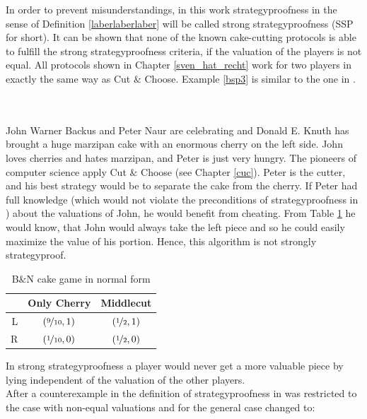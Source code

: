In order to prevent misunderstandings, in this work strategyproofness in the sense of Definition \ref{laberlaberlaber} will be called strong strategyproofness (SSP for short). It can be shown that none of the known cake-cutting protocols is able to fulfill the strong strategyproofness criteria, if the valuation of the players is not equal. All protocols shown in Chapter \ref{sven_hat_recht} work for two players in exactly the same way as Cut $\&$ Choose. Example \ref{bsp3} is similar to the one in \cite{chen:truth}.

\begin{bsp}
\label{bsp3}
\textcolor{white}{x}\\\\
John Warner Backus and Peter Naur are celebrating and Donald E. Knuth has brought a huge marzipan cake with an enormous cherry on the left side. John loves cherries and hates marzipan, and Peter is just very hungry. The pioneers of computer science apply Cut $\&$ Choose (see Chapter \ref{cuc}). Peter is the cutter, and his best strategy would be to separate the cake from the cherry. If Peter had full knowledge (which would not violate the preconditions of strategyproofness in \cite{why}) about the valuations of John, he would benefit from cheating. From Table \ref{Table4} he would know, that John would always take the left piece and so he could easily maximize the value of his portion. Hence, this algorithm is not strongly strategyproof.  
\end{bsp}
\begin{table}[htb]
\centering
 \renewcommand{\arraystretch}{1.2} 
\begin{tabular}{c|c|c|}
\cline{2-3}
&\multicolumn{1}{|c|}{{Only Cherry}}& {Middlecut}\\
\hline
\multicolumn{1}{|r|}{{L}}&$\left(\nicefrac{9}{10}, 1\right)$&$\left(\nicefrac{1}{2}, 1\right)$\\
\hline
\multicolumn{1}{|r|}{{R}}&$\left(\nicefrac{1}{10}, 0\right)$&$\left(\nicefrac{1}{2}, 0\right)$\\
\hline
\end{tabular}
\caption{B$\&$N cake game in normal form}\label{Table4}
\end{table}
In strong strategyproofness a player would never get a more valuable piece by lying independent of the valuation of the other players.\\
\newline
After a counterexample in \cite{ccc} the definition of strategyproofness in \cite{pie} was restricted to the case with non-equal valuations and for the general case changed to:

